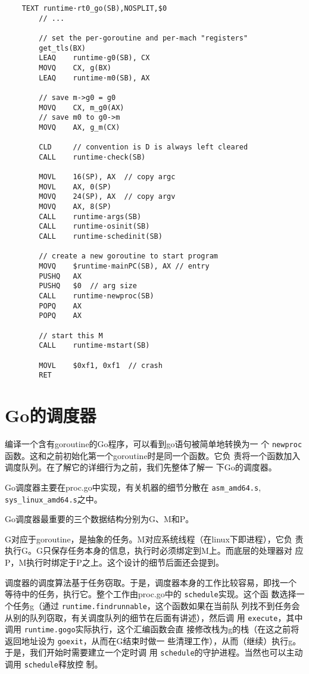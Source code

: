 \documentclass[UTF8,b5paper,fontset=adobe]{ctexart}
\begin{document}
\begin{verbatim}
    TEXT runtime·rt0_go(SB),NOSPLIT,$0
        // ...

        // set the per-goroutine and per-mach "registers"
        get_tls(BX)
        LEAQ    runtime·g0(SB), CX
        MOVQ    CX, g(BX)
        LEAQ    runtime·m0(SB), AX

        // save m->g0 = g0
        MOVQ    CX, m_g0(AX)
        // save m0 to g0->m
        MOVQ    AX, g_m(CX)

        CLD     // convention is D is always left cleared
        CALL    runtime·check(SB)

        MOVL    16(SP), AX  // copy argc
        MOVL    AX, 0(SP)
        MOVQ    24(SP), AX  // copy argv
        MOVQ    AX, 8(SP)
        CALL    runtime·args(SB)
        CALL    runtime·osinit(SB)
        CALL    runtime·schedinit(SB)

        // create a new goroutine to start program
        MOVQ    $runtime·mainPC(SB), AX // entry
        PUSHQ   AX
        PUSHQ   $0  // arg size
        CALL    runtime·newproc(SB)
        POPQ    AX
        POPQ    AX

        // start this M
        CALL    runtime·mstart(SB)

        MOVL    $0xf1, 0xf1  // crash
        RET
\end{verbatim}

\section{Go的调度器}

编译一个含有goroutine的Go程序，可以看到go语句被简单地转换为一
个 \verb+newproc+函数。这和之前初始化第一个goroutine时是同一个函数。它负
责将一个函数加入调度队列。在了解它的详细行为之前，我们先整体了解一
下Go的调度器。

Go调度器主要在proc.go中实现，有关机器的细节分散在 \verb+asm_amd64.s+,
 \verb+sys_linux_amd64.s+之中。

Go调度器最重要的三个数据结构分别为G、M和P。

G对应于goroutine，是抽象的任务。M对应系统线程（在linux下即进程），它负
责执行G。G只保存任务本身的信息，执行时必须绑定到M上。而底层的处理器对
应P，M执行时绑定于P之上。这个设计的细节后面还会提到。

调度器的调度算法基于任务窃取。于是，调度器本身的工作比较容易，即找一个
等待中的任务，执行它。整个工作由proc.go中的 \verb+schedule+实现。这个函
数选择一个任务g（通过 \verb+runtime.findrunnable+，这个函数如果在当前队
列找不到任务会从别的队列窃取，有关调度队列的细节在后面有讲述），然后调
用 \verb+execute+，其中调用 \verb+runtime.gogo+实际执行，这个汇编函数会直
接修改栈为g的栈（在这之前将返回地址设为 \verb+goexit+，从而在G结束时做一
些清理工作），从而（继续）执行g。于是，我们开始时需要建立一个定时调
用 \verb+schedule+的守护进程。当然也可以主动调用 \verb+schedule+释放控
制。
\end{document}
